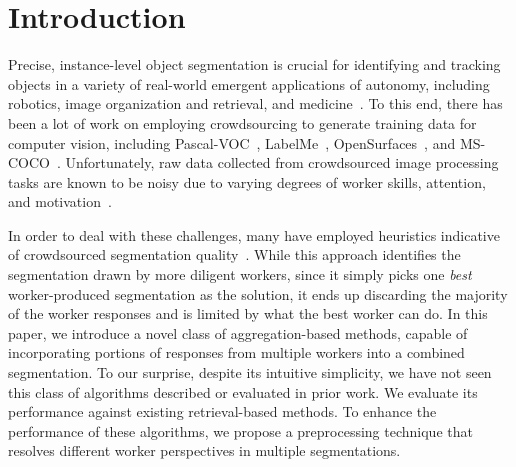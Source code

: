 \section{Introduction\label{sec:intro}}
Precise, instance-level object segmentation is crucial for identifying and tracking objects in a variety of real-world emergent applications of autonomy, including robotics\cite{Natonek1998}, image organization and retrieval\cite{Yamaguchi2012}, and medicine~\cite{Irshad2014}. To this end, there has been a lot of work on employing crowdsourcing to generate training data for computer vision, including Pascal-VOC~\cite{Everingham15}, LabelMe~\cite{Torralba2010}, OpenSurfaces~\cite{bell15minc}, and MS-COCO~\cite{Lin2012}. Unfortunately, raw data collected from crowdsourced image processing tasks are known to be noisy due to varying degrees of worker skills, attention, and motivation~\cite{bell14intrinsic,MDWWelinder2010}. 
\par In order to deal with these challenges, many have employed heuristics indicative of crowdsourced segmentation quality~\cite{Cabezas2015,Sameki2015,Sorokin2008}. While this approach identifies the segmentation drawn by more diligent workers, since it simply picks one \textit{best} worker-produced segmentation as the solution, it ends up discarding the majority of the worker responses and is limited by what the best worker can do. In this paper, we introduce a novel class of aggregation-based methods, capable of incorporating portions of responses from multiple workers into a combined segmentation. To our surprise, despite its intuitive simplicity, we have not seen this class of algorithms described or evaluated in prior work. We evaluate its performance against existing retrieval-based methods. To enhance the performance of these algorithms, we propose a preprocessing technique that resolves different worker perspectives in multiple segmentations. 
% 
% 
